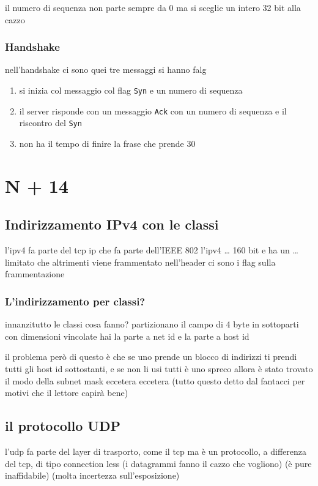 \documentclass[11pt]{article}
\begin{document}
il numero di sequenza non parte sempre da 0 ma si sceglie un intero 32 bit alla cazzo

\subsubsection{Handshake}
\label{sec:org3c705ff}
nell'handshake ci sono quei tre messaggi
si hanno falg

\begin{enumerate}
\item si inizia col messaggio col flag \texttt{Syn} e un numero di sequenza
\item il server risponde con un messaggio \texttt{Ack} con un numero di sequenza e il riscontro del \texttt{Syn}
\item non ha il tempo di finire la frase che prende 30
\end{enumerate}

\section{N + 14}
\label{sec:org964092b}
\subsection{Indirizzamento IPv4 con le classi}
\label{sec:org001e997}
l'ipv4 fa parte del tcp ip che fa parte dell'IEEE 802
l'ipv4 \ldots{} 160 bit e ha un \ldots{} limitato che altrimenti viene frammentato
nell'header ci sono i flag sulla frammentazione

\subsubsection{L'indirizzamento per classi?}
\label{sec:orgc4bc4c4}
innanzitutto le classi cosa fanno?
partizionano il campo di 4 byte in sottoparti con dimensioni vincolate
hai la parte a net id e la parte a host id

il problema però di questo è che se uno prende un blocco di indirizzi ti prendi tutti gli host id sottostanti, e se non li usi tutti è uno spreco
allora è stato trovato il modo della subnet mask eccetera eccetera
(tutto questo detto dal fantacci per motivi che il lettore capirà bene)

\subsection{il protocollo UDP}
\label{sec:org00ef35f}
l'udp fa parte del layer di trasporto, come il tcp
ma è un protocollo, a differenza del tcp, di tipo connection less (i datagrammi fanno il cazzo che vogliono)
(è pure inaffidabile)
(molta incertezza sull'esposizione)
\end{document}
